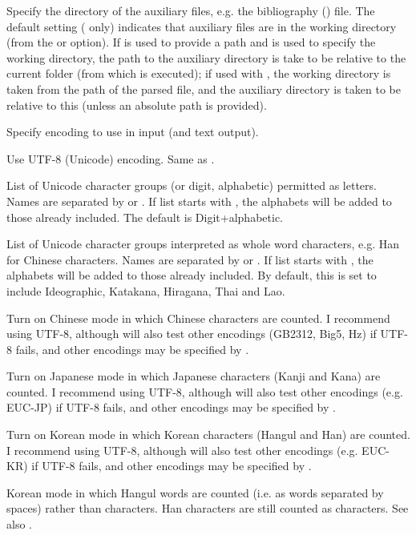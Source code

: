 \begin{description}
\option[-auxdir\alt{=\ldots}]Specify the directory of the auxiliary files, e.g. the bibliography () file. The default setting ( only) indicates that auxiliary files are in the working directory (from the  or  option). If  is used to provide a path and  is used to specify the working directory, the path to the auxiliary directory is take to be relative to the current folder (from which \TeXcount{} is executed); if used with , the working directory is taken from the path of the parsed file, and the auxiliary directory is taken to be relative to this (unless an absolute path is provided).

\option[-enc=, -encoding=]Specify encoding to use in input (and text output).

Use UTF-8 (Unicode) encoding. Same as .

\option[-alpha=, -alphabets=]List of Unicode character groups (or digit, alphabetic) permitted as letters. Names are separated by \code{,} or \code{+}. If list starts with \code{+}, the alphabets will be added to those already included. The default is Digit+alphabetic.

\option[-logo=, -logograms=]List of Unicode character groups interpreted as whole word characters, e.g. Han for Chinese characters. Names are separated by \code{,} or \code{+}. If list starts with \code{+}, the alphabets will be added to those already included. By default, this is set to include Ideographic, Katakana, Hiragana, Thai and Lao.

Turn on Chinese mode in which Chinese characters are counted. I recommend using UTF-8, although \TeXcount{} will also test other encodings (GB2312, Big5, Hz) if UTF-8 fails, and other encodings may be specified by .

\option[-jp, -japanese]Turn on Japanese mode in which Japanese characters (Kanji and Kana) are counted. I recommend using UTF-8, although \TeXcount{} will also test other encodings (e.g. EUC-JP) if UTF-8 fails, and other encodings may be specified by .

\option[-kr, -korean]Turn on Korean mode in which Korean characters (Hangul and Han) are counted. I recommend using UTF-8, although \TeXcount{} will also test other encodings (e.g. EUC-KR) if UTF-8 fails, and other encodings may be specified by .

Korean mode in which Hangul words are counted (i.e. as words separated by spaces) rather than characters. Han characters are still counted as characters. See also .


\end{description}
